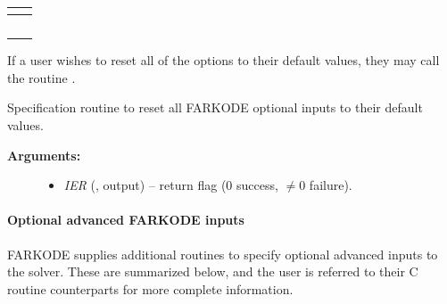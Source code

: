 \documentclass[letterpaper,10pt,english]{sphinxmanual}
\begin{document}
\begin{tabulary}{\linewidth}{|L|L|}
 & 
{\hyperref[c_interface/User_callable:ARKodeSetFixedStepBounds]{}}
\\\hline

 & 
{\hyperref[c_interface/User_callable:ARKodeSetMaxEFailGrowth]{}}
\\\hline

 & 
{\hyperref[c_interface/User_callable:ARKodeSetMaxCFailGrowth]{}}
\\\hline

 & 
{\hyperref[c_interface/User_callable:ARKodeSetNonlinCRDown]{}}
\\\hline

 & 
{\hyperref[c_interface/User_callable:ARKodeSetNonlinRDiv]{}}
\\\hline

 & 
{\hyperref[c_interface/User_callable:ARKodeSetDeltaGammaMax]{}}
\\\hline
\end{tabulary}


If a user wishes to reset all of the options to their default values,
they may call the routine {\hyperref[f_interface/Usage:f/_/FARKSETDEFAULTS]{}}.

\begin{fulllineitems}
\label{f_interface/Usage:f/_/FARKSETDEFAULTS}
Specification routine to reset all FARKODE optional
inputs to their default values.
\begin{description}
\item[{\textbf{Arguments:}}] \leavevmode\begin{itemize}
\item {} 
\emph{IER} (, output) -- return flag (0 success, $\ne 0$ failure).

\end{itemize}

\end{description}

\end{fulllineitems}



\paragraph{Optional advanced FARKODE inputs}
\label{f_interface/Usage:optional-advanced-farkode-inputs}
FARKODE supplies additional routines to specify optional advanced
inputs to the {\hyperref[c_interface/User_callable:ARKode]{}} solver.  These are summarized below,
and the user is referred to their C routine counterparts for more
complete information.
\end{document}

